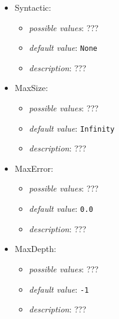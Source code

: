 \documentclass{article}
\begin{document}
\begin{itemize}
    \item Syntactic:
           \begin{itemize}
                \item \emph{possible values}: ???
                \item \emph{default value}: \texttt{None}
                \item \emph{description}: ???
           \end{itemize}
    \item MaxSize:
           \begin{itemize}
                \item \emph{possible values}: ???
                \item \emph{default value}: \texttt{Infinity}
                \item \emph{description}: ???
           \end{itemize}
    \item MaxError:
           \begin{itemize}
                \item \emph{possible values}: ???
                \item \emph{default value}: \texttt{0.0}
                \item \emph{description}: ???
           \end{itemize}
    \item MaxDepth:
           \begin{itemize}
                \item \emph{possible values}: ???
                \item \emph{default value}: \texttt{-1}
                \item \emph{description}: ???
           \end{itemize}
\end{itemize}
\end{document}
